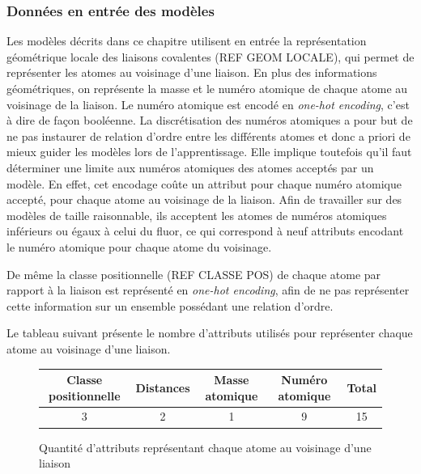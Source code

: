 \subsubsection{Données en entrée des modèles}
\par Les modèles décrits dans ce chapitre utilisent en entrée la représentation géométrique locale des liaisons covalentes (REF GEOM LOCALE), qui permet de représenter les atomes au voisinage d'une liaison. En plus des informations géométriques, on représente la masse et le numéro atomique de chaque atome au voisinage de la liaison. Le numéro atomique est encodé en \emph{one-hot encoding}, c'est à dire de façon booléenne. La discrétisation des numéros atomiques a pour but de ne pas instaurer de relation d'ordre entre les différents atomes et donc a priori de mieux guider les modèles lors de l'apprentissage. Elle implique toutefois qu'il faut déterminer une limite aux numéros atomiques des atomes acceptés par un modèle. En effet, cet encodage coûte un attribut pour chaque numéro atomique accepté, pour chaque atome au voisinage de la liaison. Afin de travailler sur des modèles de taille raisonnable, ils acceptent les atomes de numéros atomiques inférieurs ou égaux à celui du fluor, ce qui correspond à neuf attributs encodant le numéro atomique pour chaque atome du voisinage.
\par De même la classe positionnelle (REF CLASSE POS) de chaque atome par rapport à la liaison est représenté en \emph{one-hot encoding}, afin de ne pas représenter cette information sur un ensemble possédant une relation d'ordre.\\

\par Le tableau suivant présente le nombre d'attributs utilisés pour représenter chaque atome au voisinage d'une liaison.

\begin{figure}[!h]
	\centering
	
	\begin{tabular}{|c|c|c|c|c|}
		\hline
		\textbf{Classe positionnelle} & \textbf{Distances} & \textbf{Masse atomique} & \textbf{Numéro atomique} & \textbf{Total}\\ \hline
		3 & 2 & 1 & 9 & 15\\ \hline
	\end{tabular}
	\caption{Quantité d'attributs représentant chaque atome au voisinage d'une liaison}
\end{figure}

